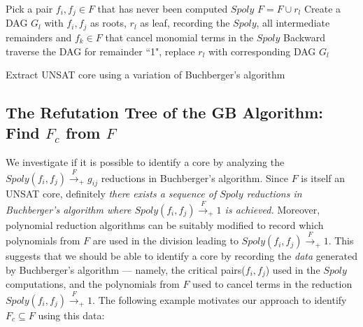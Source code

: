 \begin{algorithm}[hbt]
\SetAlgoNoLine
{
	Pick a pair $f_i,f_j\in F$ that has never been computed $Spoly$\;
	{
		$F = F\cup r_l$\;
		Create a DAG $G_l$ with $f_i,f_j$ as roots, $r_l$ as leaf, recording the $Spoly$, all intermediate remainders and $f_k\in F$ that cancel monomial terms in the $Spoly$\;
	}
}
Backward traverse the DAG for remainder ``1", replace $r_l$ with corresponding DAG $G_l$\;
\caption {Extract UNSAT core using a variation of Buchberger's algorithm}\label{alg:UNSAT}
\end{algorithm}

\subsection{The Refutation Tree of the GB Algorithm: Find $F_c$ from $F$}

We investigate if it is possible to identify a core by analyzing the
$Spoly(f_i,f_j)\xrightarrow{F}_+ g_{ij}$ reductions in Buchberger's
algorithm. Since $F$ is itself an UNSAT core, 
definitely {\it there exists  
a sequence of $Spoly$ reductions in Buchberger's algorithm where
$Spoly(f_i, f_j) \xrightarrow{F}_+ 1$ is achieved.} Moreover, 
polynomial reduction algorithms can be suitably modified to record
which polynomials from $F$ are used in the division leading to
$Spoly(f_i,f_j)\xrightarrow{F}_+1$. This suggests that 
we should be able to identify a core by recording
the {\it data} generated by Buchberger's algorithm --- namely, the
critical pairs($f_i,f_j$) used in the $Spoly$ computations,
and the polynomials from $F$ used to cancel terms in the reduction
$Spoly(f_i,f_j)\xrightarrow{F}_+1$. The following example motivates
our approach to identify  $F_c \subseteq F$ using this data:

